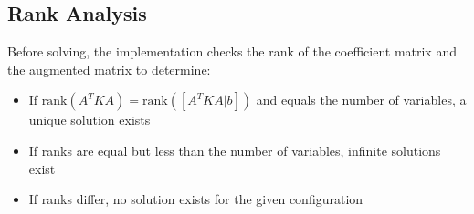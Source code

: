 \documentclass[12pt]{article}
\begin{document}
\subsection{Rank Analysis}
Before solving, the implementation checks the rank of the coefficient matrix and the augmented matrix to determine:
\begin{itemize}
\item If $\text{rank}(A^T K A) = \text{rank}([A^T K A | b])$ and equals the number of variables, a unique solution exists
\item If ranks are equal but less than the number of variables, infinite solutions exist
\item If ranks differ, no solution exists for the given configuration
\end{itemize}
\end{document}

